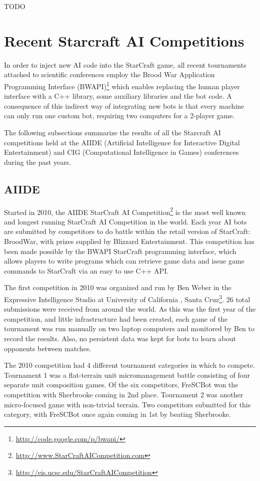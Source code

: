 \documentclass[journal]{IEEEtran}
\begin{document}
{\color{red} TODO}

\section{Recent Starcraft AI Competitions}\label{sec:competition}

In order to inject new AI code into the StarCraft game, all recent
tournaments attached to scientific conferences employ the 
Brood War Application Programming Interface 
(BWAPI)\footnote{\url{http://code.google.com/p/bwapi/}} which 
enables replacing the human player interface with a C++ library,
some auxiliary libraries and the bot code. A consequence of this
indirect way of integrating new bots is that every machine can
only run one custom bot, requiring two computers for a 2-player game.

The following subsections summarize the results of all the Starcraft AI competitions held at the AIIDE (Artificial Intelligence for Interactive Digital Entertainment) and CIG (Computational Intelligence in Games) conferences during the past years.

\subsection{AIIDE}\label{sec:AIIDE}

Started in 2010, the AIIDE StarCraft AI Competition\footnote{\url{http://www.StarCraftAICompetition.com}} is the most
well known and longest running StarCraft AI Competition in the world. Each year
AI bots are submitted by competitors to do battle within the retail version of
StarCraft: BroodWar, with prizes supplied by Blizzard Entertainment. This
competition has been made possible by the BWAPI StarCraft programming interface,
which allows players to write programs which can retrieve game data and issue
game commands to StarCraft via an easy to use C++ API.


The first competition in 2010 was organized and run by Ben Weber in the Expressive
Intelligence Studio at University of California , Santa Cruz\footnote{\url{http://eis.ucsc.edu/StarCraftAICompetition}}. 26 total submissions
were received from around the world. As this was the first year of the competition,
and little infrastructure had been created, each game of the tournament was run 
manually on two laptop computers and monitored by Ben to record the results. Also,
no persistent data was kept for bots to learn about opponents between matches.

The 2010 competition had 4 different tournament categories in which to compete. Tournament 1
was a flat-terrain unit micromanagement battle consisting of four separate unit
composition games. Of the six competitors, FreSCBot won the competition with
Sherbrooke coming in 2nd place. Tournament 2 was another micro-focused game with
non-trivial terrain. Two competitors submitted for this category, with FreSCBot
once again coming in 1st by beating Sherbrooke.
\end{document}
